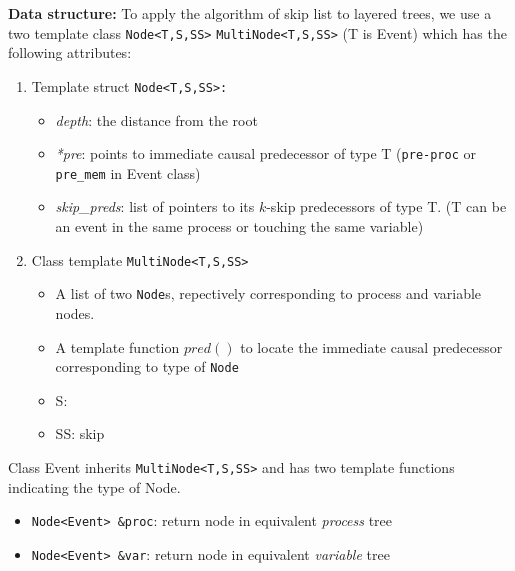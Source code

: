 \documentclass{llncs}
\begin{document}
\noindent
\textbf{Data structure:}
To apply the algorithm of skip list to layered trees, we use a two template class \verb!Node<T,S,SS>! \verb!MultiNode<T,S,SS>! (T is Event) which has the following attributes:
\begin{enumerate}
\item 
	Template struct \verb!Node<T,S,SS>:!
	\begin{itemize}
		\item \textit{depth}: the distance from the root
		\item \textit{*pre}: points to immediate causal predecessor of type T (\verb!pre-proc! or \verb!pre_mem! in Event class)
		\item \textit{skip\_preds}: list of pointers to its $k$-skip predecessors of type T.	
		(T can be an event in the same process or touching the same variable)
	\end{itemize}
\item
	Class template \verb!MultiNode<T,S,SS>!
	\begin{itemize}
	\item
		A list of two \verb!Node!s, repectively corresponding to process and variable nodes.
	\item
		A template function $pred()$ to locate the immediate causal predecessor corresponding to type of \verb!Node!
	\item
		S: 
	\item
		SS: skip
	\end{itemize}
\end{enumerate}

\noindent
Class Event inherits \verb!MultiNode<T,S,SS>! and has two template functions indicating the type of Node.
\begin{itemize}
\item
	\verb!Node<Event> &proc!: return node in equivalent \textit{process} tree
\item	
	\verb!Node<Event> &var!: return node in equivalent \textit{variable} tree 	
\end{itemize}
\end{document}
